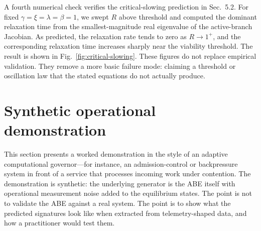 \documentclass[11pt]{article}
\begin{document}
A fourth numerical check verifies the critical-slowing prediction in Sec.~5.2. For fixed
$\gamma=\xi=\lambda=\beta=1$, we swept $R$ above threshold and computed the
dominant relaxation time from the smallest-magnitude real eigenvalue of the active-branch
Jacobian. As predicted, the relaxation rate tends to zero as $R\to 1^+$, and the
corresponding relaxation time increases sharply near the viability threshold. The result is shown in Fig.~\ref{fig:critical-slowing}.
These figures do not replace empirical validation. They remove a more basic failure mode: claiming a threshold or oscillation law that the stated equations do not actually produce.

\clearpage
\section{Synthetic operational demonstration}\label{sec:synthetic}
This section presents a worked demonstration in the style of an adaptive computational governor---for instance, an admission-control or backpressure system in front of a service that processes incoming work under contention. The demonstration is synthetic: the underlying generator is the ABE itself with operational measurement noise added to the equilibrium states. The point is not to validate the ABE against a real system. The point is to show what the predicted signatures look like when extracted from telemetry-shaped data, and how a practitioner would test them.
\end{document}
